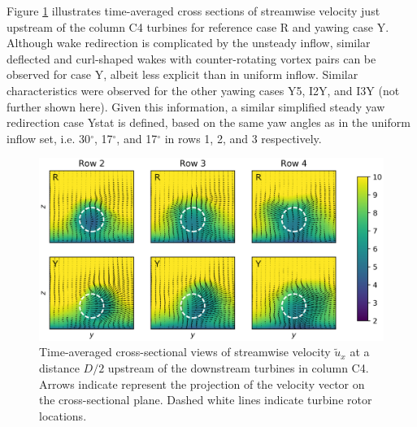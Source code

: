 	Figure \ref{fig:cross_section_turb} illustrates time-averaged cross sections of streamwise velocity just upstream of the column C4 turbines for reference case R and yawing case Y. Although wake redirection is complicated by the unsteady inflow, similar deflected and curl-shaped wakes with counter-rotating vortex pairs can be observed for case Y, albeit less explicit than in uniform inflow. Similar characteristics were observed for the other yawing cases Y5, I2Y, and I3Y (not further shown here). Given this information, a similar simplified steady yaw redirection case Ystat is defined, based on the same yaw angles as in the uniform inflow set, i.e. 30$^\circ$, 17$^\circ$, and 17$^\circ$ in rows 1, 2, and 3 respectively.
	\begin{figure}
		\includegraphics[width=\textwidth]{chapters/optimal_yaw_control/frontview_yaw_turb.eps}
		\caption{Time-averaged cross-sectional views of streamwise velocity $\widetilde{u}_x$ at a distance $D/2$ upstream of the downstream turbines in column C4. Arrows indicate represent the projection of the velocity vector on the cross-sectional plane. Dashed white lines indicate turbine rotor locations. \label{fig:cross_section_turb}}
	\end{figure}

